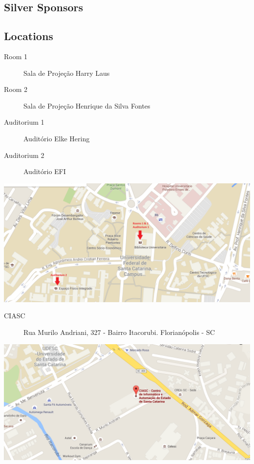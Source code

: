 \documentclass[12pt]{article}
\begin{document}
\subsection*{Silver Sponsors}
\begin{minipage}{0.45\textwidth}

\end{minipage}
\hfill
\begin{minipage}{0.45\textwidth}

\end{minipage}

\newpage

\subsection*{Locations}
\begin{center}
\begin{description}
   \item[Room 1] Sala de Projeção Harry Laus
   \item[Room 2] Sala de Projeção Henrique da Silva Fontes
   \item[Auditorium 1] Auditório Elke Hering
   \item[Auditorium 2] Auditório EFI
\end{description}
\includegraphics[width=\textwidth]{references_1}
\begin{description}
   \item[CIASC] Rua Murilo Andriani, 327 - Bairro Itacorubi. Florianópolis - SC
\end{description}
\includegraphics[width=\textwidth]{references_2}
\end{center}
\end{document}
